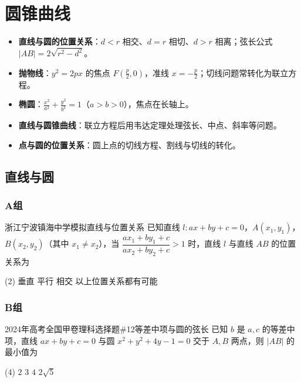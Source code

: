 \chapter{圆锥曲线}
\setcounter{choicecounter}{0}

\begin{knowledgeframe}
\begin{itemize}
	\item \textbf{直线与圆的位置关系}：$d<r$ 相交、$d=r$ 相切、$d>r$ 相离；弦长公式 $|AB|=2\sqrt{r^2-d^2}$。
	\item \textbf{抛物线}：$y^2=2px$ 的焦点 $F(\frac{p}{2},0)$，准线 $x=-\frac{p}{2}$；切线问题常转化为联立方程。
	\item \textbf{椭圆}：$\frac{x^2}{a^2}+\frac{y^2}{b^2}=1$（$a>b>0$），焦点在长轴上。
	\item \textbf{直线与圆锥曲线}：联立方程后用韦达定理处理弦长、中点、斜率等问题。
	\item \textbf{点与圆的位置关系}：圆上点的切线方程、割线与切线的转化。
\end{itemize}
\end{knowledgeframe}

\section{直线与圆}

\startexercise

\subsection*{A组}

\begin{choice}{浙江宁波镇海中学模拟}{直线与位置关系}
	已知直线 $l: ax+by+c=0$，$A(x_1, y_1)$，$B(x_2, y_2)$（其中 $x_1 \ne x_2$），当 $\dfrac{ax_1+by_1+c}{ax_2+by_2+c} > 1$ 时，直线 $l$ 与直线 $AB$ 的位置关系为
	\begin{tasks}(2)
		\task 垂直
		\task 平行
		\task 相交
		\task 以上位置关系都有可能
	\end{tasks}
\end{choice}

\subsection*{B组}

\begin{choice}{2024年高考全国甲卷理科选择题\#12}{等差中项与圆的弦长}
	已知 $b$ 是 $a,c$ 的等差中项，直线 $ax+by+c=0$ 与圆 $x^{2}+y^{2}+4y-1=0$ 交于 $A,B$ 两点，则 $|AB|$ 的最小值为
	\begin{tasks}(4)
		\task $2$
		\task $3$
		\task $4$
		\task $2\sqrt{5}$
	\end{tasks}
\end{choice}

